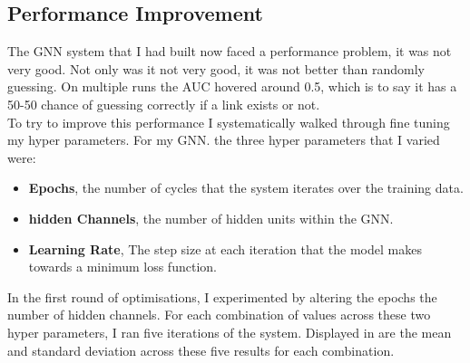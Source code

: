 \documentclass{l4proj}
\begin{document}
\subsection{Performance Improvement}

The GNN system that I had built now faced a performance problem, it was not very good. Not only was it not very good, it was not better than randomly guessing. On multiple runs the AUC hovered around 0.5, which is to say it has a 50-50 chance of guessing correctly if a link exists or not. \\

To try to improve this performance I systematically walked through fine tuning my hyper parameters. For my GNN. the three hyper parameters that I varied were:
\\
\begin{itemize}
    \item \textbf{Epochs}, the number of cycles that the system iterates over the training data.
    \item \textbf{hidden Channels}, the number of hidden units within the GNN.
    \item \textbf{Learning Rate}, The step size at each iteration that the model makes towards a minimum loss function.\\
\end{itemize}

In the first round of optimisations, I experimented by altering the epochs the number of hidden channels. For each combination of values across these two hyper parameters, I ran five iterations of the system. Displayed in  are the mean and standard deviation across these five results for each combination. \\
\end{document}
